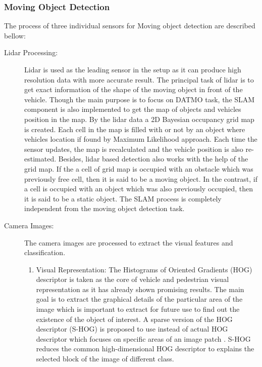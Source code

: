 \subsubsection{Moving Object Detection}
The process of three individual sensors for Moving object detection are described bellow:
\begin{description}
    \item[Lidar Processing:] Lidar is used as the leading sensor in the setup as it can produce high resolution data with more accurate result. The principal task of lidar is to get exact information of the shape of the moving object in front of the vehicle. Though the main purpose is to focus on DATMO task, the SLAM component is also implemented to get the map of objects and vehicles position in the map\cite{Chavez_Garcia_2016}. By the lidar data a 2D Bayesian occupancy grid map is created. Each cell in the map is filled with or not by an object where vehicles location if found by Maximum Likelihood approach. Each time the sensor updates, the map is recalculated and the vehicle position is also re-estimated. Besides, lidar based detection also works with the help of the grid map. If the a cell of grid map is occupied with an obstacle which was previously free cell, then it is said to be a moving object. In the contrast, if a cell is occupied with an object which was also previously occupied, then it is said to be a static object. The SLAM process is completely independent from the moving object detection task.
    \item[Camera Images:] The camera images are processed to extract the visual features and classification.
    \begin{enumerate}
        \item{Visual Representation:} The Histograms of Oriented Gradients (HOG) descriptor is taken as the core of vehicle and pedestrian visual representation as it has already shown promising results\cite{Chavez_Garcia_2016}. The main goal is to extract the graphical details of the particular area of the image which is important to extract for future use to find out the existence of the object of interest. A sparse version of the HOG descriptor (S-HOG) is proposed to use instead of actual HOG descriptor which focuses on specific areas of an image patch \cite{Chavez_Garcia_2016}. S-HOG reduces the common high-dimensional HOG descriptor to explains the selected block of the image of different class.

\end{enumerate}
\end{description}
